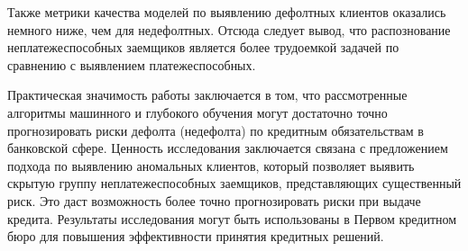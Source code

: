 Также метрики качества моделей по выявлению дефолтных клиентов оказались немного ниже, чем для недефолтных. Отсюда следует вывод, что распознование неплатежеспособных заемщиков является более трудоемкой задачей по сравнению с выявлением платежеспособных. 

Практическая значимость работы заключается в том, что рассмотренные алгоритмы машинного и глубокого обучения могут достаточно точно прогнозировать риски дефолта (недефолта) по кредитным обязательствам в банковской сфере. Ценность исследования заключается связана с предложением подхода по выявлению аномальных клиентов, который позволяет выявить скрытую группу неплатежеспособных заемщиков, представляющих существенный риск. Это даст возможность более точно прогнозировать риски при выдаче кредита. Результаты исследования могут быть использованы в Первом кредитном бюро для повышения эффективности принятия кредитных решений.



